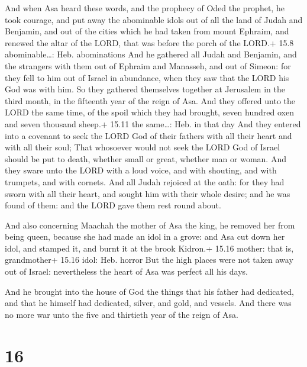  And when Asa heard these words, and the prophecy of Oded
the prophet, he took courage, and put away the abominable idols out of
all the land of Judah and Benjamin, and out of the cities which he had
taken from mount Ephraim, and renewed the altar of the LORD, that was
before the porch of the LORD.+ 15.8 abominable\ldots: Heb. abominations
 And he gathered all Judah and Benjamin, and the strangers
with them out of Ephraim and Manasseh, and out of Simeon: for they fell
to him out of Israel in abundance, when they saw that the LORD his God
was with him.  So they gathered themselves together at
Jerusalem in the third month, in the fifteenth year of the reign of Asa.
 And they offered unto the LORD the same time, of the spoil
which they had brought, seven hundred oxen and seven thousand sheep.+
15.11 the same\ldots: Heb. in that day  And they entered
into a covenant to seek the LORD God of their fathers with all their
heart and with all their soul;  That whosoever would not
seek the LORD God of Israel should be put to death, whether small or
great, whether man or woman.  And they sware unto the LORD
with a loud voice, and with shouting, and with trumpets, and with
cornets.  And all Judah rejoiced at the oath: for they had
sworn with all their heart, and sought him with their whole desire; and
he was found of them: and the LORD gave them rest round about.

 And also concerning Maachah the mother of Asa the king,
he removed her from being queen, because she had made an idol in a
grove: and Asa cut down her idol, and stamped it, and burnt it at the
brook Kidron.+ 15.16 mother: that is, grandmother+ 15.16 idol: Heb.
horror  But the high places were not taken away out of
Israel: nevertheless the heart of Asa was perfect all his days.

 And he brought into the house of God the things that his
father had dedicated, and that he himself had dedicated, silver, and
gold, and vessels.  And there was no more war unto the five
and thirtieth year of the reign of Asa.

\hypertarget{section-15}{%
\section{16}\label{section-15}}

